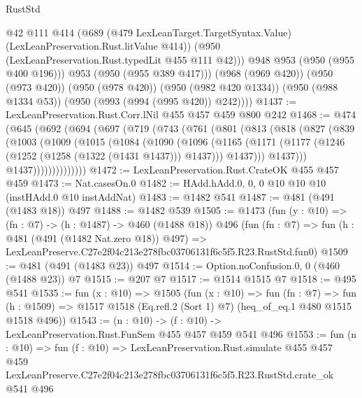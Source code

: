 \begin{lexlean}{RustStd}
\begin{coremodule}
              @42
              @111
              @414
              (@689
                (@479 LexLeanTarget.TargetSyntax.Value)
                (LexLeanPreservation.Rust.litValue @414))
              (@950 (LexLeanPreservation.Rust.typedLit @455 @111 @42)))
            @948
            @953
            (@950 (@955 @400 @196)))
          @953
          (@950 (@955 @389 @417)))
        (@968 (@969 @420))
        (@950 (@973 @420))
        (@950 (@978 @420))
        (@950 (@982 @420 @1334))
        (@950 (@988 @1334 @53))
        (@950 (@993 (@994 (@995 @420)) @242))))
@1437 := LexLeanPreservation.Rust.Corr.lNil @455 @457 @459 @800 @242
@1468 := @474
    (@645
      (@692
        (@694
          (@697
            (@719
              (@743
                (@761
                  (@801
                    (@813
                      (@818
                        (@827
                          (@839
                            (@1003
                              (@1009
                                (@1015
                                  (@1084
                                    (@1090
                                      (@1096
                                        (@1165
                                          (@1171
                                            (@1177
                                              (@1246 (@1252 (@1258 (@1322 (@1431 @1437))) @1437)))
                                            @1437)))
                                      @1437)))
                                @1437))))))))))))))
@1472 := LexLeanPreservation.Rust.CrateOK @455 @457 @459
@1473 := Nat.casesOn.{0}
@1482 := HAdd.hAdd.{0, 0, 0} @10 @10 @10 (instHAdd.{0} @10 instAddNat)
@1483 := @1482 @541
@1487 := @481 (@491 (@1483 @18)) @497
@1488 := @1482 @539
@1505 := @1473
    (fun (y : @10) => (fn : @7) -> (h : @1487) -> @460 (@1488 @18))
    @496
    (fun (fn : @7) =>
    fun (h : @481 (@491 (@1482 Nat.zero @18)) @497) =>
    LexLeanPreserve.C27e2f04c213e278fbc03706131f6c5f5.R23.RustStd.fun0)
@1509 := @481 (@491 (@1483 @23)) @497
@1514 := Option.noConfusion.{0, 0} (@460 (@1488 @23)) @7
@1515 := @207 @7
@1517 := @1514 @1515 @7
@1518 := @495 @541
@1535 := fun (x : @10) =>
  @1505
    (fun (x : @10) =>
    fun (fn : @7) =>
    fun (h : @1509) => @1517 @1518 (Eq.refl.{2} (Sort 1) @7) (heq_of_eq.{1} @480 @1515 @1518 @496))
@1543 := (n : @10) -> (f : @10) -> LexLeanPreservation.Rust.FunSem @455 @457 @459 @541 @496
@1553 := fun (n : @10) =>
  fun (f : @10) =>
  LexLeanPreservation.Rust.simulate
    @455
    @457
    @459
    LexLeanPreserve.C27e2f04c213e278fbc03706131f6c5f5.R23.RustStd.crate_ok
    @541
    @496
\end{coremodule}
\end{lexlean}
